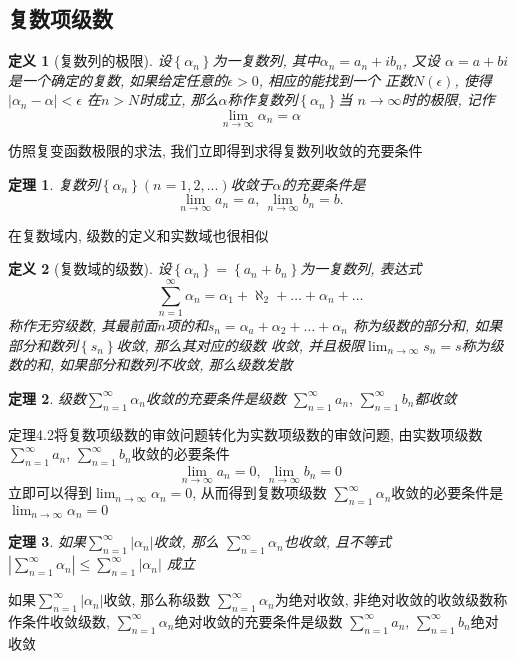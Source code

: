 \documentclass[12pt, a4paper, oneside]{ctexart}
\theoremstyle{plain}
\newtheorem{theorem}{定理}[section]
\newtheorem{definition}{定义}[section]
\theoremstyle{definition}
\theoremstyle{definition}
\begin{document}
\subsection{复数项级数}
\begin{definition}[复数列的极限]
    设$\left\{ \alpha_n \right\}$为一复数列, 其中$\alpha_n=a_n+ib_n$, 又设
    $\alpha=a+bi$是一个确定的复数, 如果给定任意的$\epsilon>0$, 相应的能找到一个
    正数$N(\epsilon)$, 使得$\left\lvert \alpha_n -\alpha \right\rvert < \epsilon$
    在$n>N$时成立, 那么$\alpha$称作复数列$\left\{ \alpha_n \right\}$当
    $n\to\infty $时的极限, 记作
    \[
        \lim_{n\to\infty}\alpha_n=\alpha
    \]
\end{definition}
\noindent 仿照复变函数极限的求法, 我们立即得到求得复数列收敛的充要条件
\begin{theorem}
    复数列$\left\{\alpha_n\right\}(n=1,2,...)$收敛于$\alpha$的充要条件是
    \[
    \lim_{n\to\infty}a_n=a,\,\lim_{n\to\infty}b_n=b.
    \]
\end{theorem}
在复数域内, 级数的定义和实数域也很相似
\begin{definition}[复数域的级数]
    设$\left\{\alpha_n\right\}=\left\{a_n+b_n\right\}$为一复数列, 表达式
    \[
    \sum_{n=1}^{\infty}\alpha_n=\alpha_1+\aleph_2+\dots+\alpha_n+\dots
    \]
    称作无穷级数, 其最前面$n$项的和$s_n=\displaystyle\alpha_a+\alpha_2+\dots+\alpha_n$
    称为级数的部分和, 如果部分和数列$\left\{s_n\right\}$收敛, 那么其对应的级数
    收敛, 并且极限$\displaystyle\lim_{n\to\infty}s_n=s$称为级数的和, 如果部分和数列不收敛,
    那么级数发散
\end{definition}
\begin{theorem}
    级数$\displaystyle\sum_{n=1}^{\infty}\alpha_n$收敛的充要条件是级数
    $\displaystyle\sum_{n=1}^{\infty}a_n,\, \sum_{n=1}^{\infty}b_n$都收敛
\end{theorem}
定理4.2将复数项级数的审敛问题转化为实数项级数的审敛问题, 由实数项级数
$\displaystyle\sum_{n=1}^{\infty}a_n,\, \sum_{n=1}^{\infty}b_n$收敛的必要条件
\[
\displaystyle\lim_{n\to\infty}a_n=0,\,\displaystyle\lim_{n\to\infty}b_n=0
\]
立即可以得到$\displaystyle\lim_{n\to\infty}\alpha_n=0$, 从而得到复数项级数
$\displaystyle\sum_{n=1}^{\infty}\alpha_n$收敛的必要条件是$\displaystyle\lim_{n\to\infty}\alpha_n=0$
\begin{theorem}
    如果$\displaystyle\sum_{n=1}^{\infty}\left\lvert \alpha_n\right\rvert $收敛, 那么
    $\displaystyle\sum_{n=1}^{\infty}\alpha_n$也收敛, 且不等式
    $\displaystyle\left\lvert \sum_{n=1}^{\infty}\alpha_n\right\rvert \leq\displaystyle\sum_{n=1}^{\infty}\left\lvert \alpha_n\right\rvert$
    成立
\end{theorem}
如果$\displaystyle\sum_{n=1}^{\infty}\left\lvert \alpha_n\right\rvert $收敛, 那么称级数
$\displaystyle\sum_{n=1}^{\infty}\alpha_n$为绝对收敛, 非绝对收敛的收敛级数称作条件收敛级数, 
$\displaystyle\sum_{n=1}^{\infty}\alpha_n$绝对收敛的充要条件是级数
$\displaystyle\sum_{n=1}^{\infty}a_n,\, \displaystyle\sum_{n=1}^{\infty}b_n$绝对收敛
\end{document}
